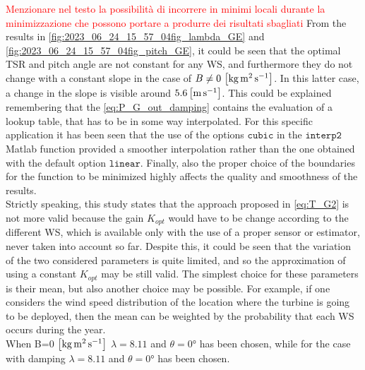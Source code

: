 \textcolor{red}{Menzionare nel testo la possibilità di incorrere in minimi locali durante la minimizzazione che possono portare a produrre dei risultati sbagliati}
From the results in \autoref{fig:2023_06_24_15_57_04fig_lambda_GE} and \ref{fig:2023_06_24_15_57_04fig_pitch_GE}, it could be seen that the optimal TSR and pitch angle are not constant for any WS, and furthermore they do not change with a constant slope in the case of $B\neq0 \, \left[\si{\kilo\gram\square\meter\per\second}\right]$. In this latter case, a change in the slope is visible around $5.6 \left[\si{\meter \per\second}\right]$. This could be explained remembering that the \autoref{eq:P_G_out_damping} contains the evaluation of a lookup table, that has to be in some way interpolated. For this specific application it has been seen that the use of the options $\texttt{cubic}$ in the $\texttt{interp2}$ Matlab function provided a smoother interpolation rather than the one obtained with the default option $\texttt{linear}$. Finally, also the proper choice of the boundaries for the function to be minimized highly affects the quality and smoothness of the results.\\
Strictly speaking, this study states that the approach proposed in \autoref{eq:T_G2} is not more valid because the gain $K_{opt}$ would have to be change according to the different WS, which is available only with the use of a proper sensor or estimator, never taken into account so far. Despite this, it could be seen that the variation of the two considered parameters is quite limited, and so the approximation of using a constant $K_{opt}$ may be still valid. The simplest choice for these parameters is their mean, but also another choice may be possible. For example, if one considers the wind speed distribution of the location where the turbine is going to be deployed, then the mean can be weighted by the probability that each WS occurs during the year. \\
When B=0 $\left[\si{\kilo\gram\square\meter\per\second}\right]$ $\lambda=8.11$ and $\theta=0 \si{\degree}$ has been chosen, while for the case with damping $\lambda=8.11$ and $\theta=0 \si{\degree}$ has been chosen.\\

